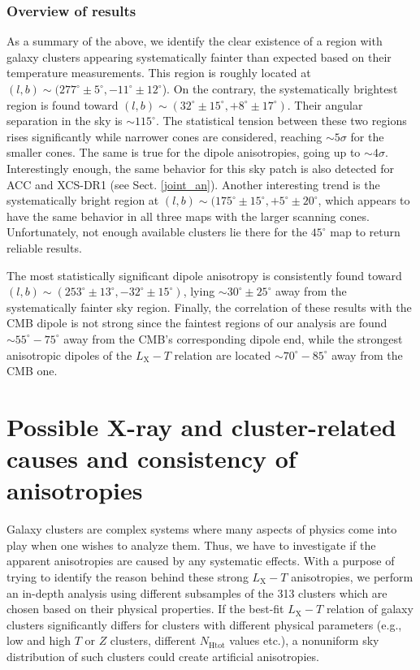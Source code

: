 \documentclass{aa}   %
\begin{document}
\subsubsection{Overview of results}

As a summary of the above, we identify the clear existence of a region with galaxy clusters appearing systematically fainter than expected based on their temperature measurements. This region is roughly located at $(l,b)\sim (277^{\circ}\pm 5^{\circ}, -11^{\circ}\pm 12^{\circ}$). On the contrary, the systematically brightest region is found toward $(l,b)\sim (32^{\circ}\pm 15^{\circ}, +8^{\circ}\pm 17^{\circ})$. Their angular separation in the sky is $\sim 115^{\circ}$. The statistical tension between these two regions rises significantly while narrower cones are considered, reaching $\sim5\sigma$ for the smaller cones. The same is true for the dipole anisotropies, going up to $\sim 4\sigma$.
Interestingly enough, the same behavior for this sky patch is also detected for ACC and XCS-DR1 (see Sect. \ref{joint_an}). 
Another interesting trend is the systematically bright region at $(l,b)\sim (175^{\circ}\pm 15^{\circ}, +5^{\circ}\pm 20^{\circ}$, which appears to have the same behavior in all three maps with the larger scanning cones. Unfortunately, not enough available clusters lie there for the $45^{\circ}$ map to return reliable results. 

The most statistically significant dipole anisotropy is consistently found toward $(l,b)\sim (253^{\circ}\pm 13^{\circ}, -32^{\circ}\pm 15^{\circ})$, lying $\sim 30^{\circ}\pm 25^{\circ}$ away from the systematically fainter sky region. Finally, the correlation of these results with the CMB dipole is not strong since the faintest regions of our analysis are found $\sim 55^{\circ}-75^{\circ}$ away from the CMB's corresponding dipole end, while the strongest anisotropic dipoles of the $L_{\text{X}}-T$ relation are located $\sim 70^{\circ}-85^{\circ}$ away from the CMB one. 

\section{Possible X-ray and cluster-related causes and consistency of anisotropies}\label{possible_causes}

Galaxy clusters are complex systems where many aspects of physics come into play when one wishes to analyze them. Thus, we have to investigate if the apparent anisotropies are caused by any systematic effects. 
With a purpose of trying to identify the reason behind these strong $L_{\text{X}}-T$ anisotropies, we perform an in-depth analysis using different subsamples of the 313 clusters which are chosen based on their physical properties. 
If the best-fit $L_{\text{X}}-T$ relation of galaxy clusters significantly differs for clusters with different physical parameters (e.g., low and high $T$ or $Z$ clusters, different $N_{\text{Htot}}$ values etc.), a nonuniform sky distribution of such clusters could create artificial anisotropies.
\end{document}
